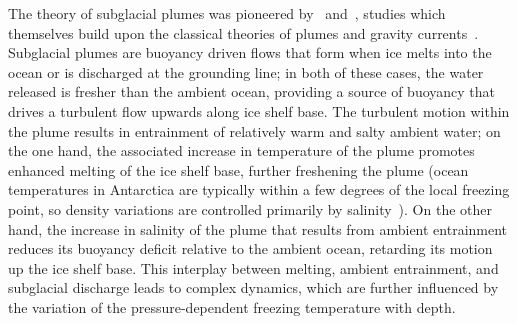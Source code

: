 \documentclass[openacc]{rsproca_new}%
\begin{document}
The theory of subglacial plumes was pioneered by~\citet{MacAyeal1985} and~\citet{Jenkins1991JGeophysResOceans}, studies which themselves build upon the classical theories of plumes and gravity currents~\citep{Ellison1959JFM, Morton1956PRSL, Turner1979}. Subglacial plumes are buoyancy driven flows that form when ice melts into the ocean or is discharged at the grounding line; in both of these cases, the water released is fresher than the ambient ocean, providing a source of buoyancy that drives a turbulent flow upwards along ice shelf base. The turbulent motion within the plume results in entrainment of relatively warm and salty ambient water; on the one hand, the associated increase in temperature of the plume promotes enhanced melting of the ice shelf base, further freshening the plume (ocean temperatures in Antarctica are typically within a few degrees of the local freezing point, so density variations are controlled primarily by salinity~\citep{Hewitt2020AnnRevFlu}). On the other hand, the increase in salinity of the plume that results from ambient entrainment reduces its buoyancy deficit relative to the ambient ocean, retarding its motion up the ice shelf base. This interplay between melting, ambient entrainment, and subglacial discharge leads to complex dynamics, which are further influenced by the variation of the pressure-dependent freezing temperature with depth. 
\end{document}
